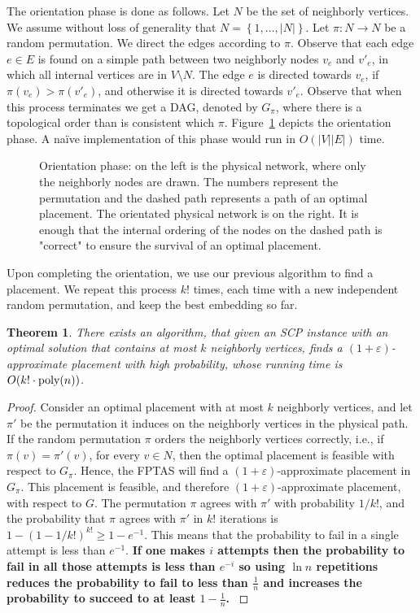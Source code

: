 \documentclass[11pt]{article}
\newcommand{\fix}[1]{{\color{purple}\textbf{#1}}}
\newtheorem{theorem}{Theorem}
\newcommand{\set}[1]{\left\{ #1 \right\}}
\newcommand{\inv}[1]{\frac{1}{#1}}
\newcommand{\abs}[1]{\left| #1 \right|}
\newcommand{\eps}{\varepsilon}
\newcommand{\scp}{\textsc{SCP}\xspace}
\begin{document}
The orientation phase is done as follows.  Let $N$ be the set of
neighborly vertices.  We assume without loss of generality that $N =
\set{1,\ldots,\abs{N}}$.
%
Let $\pi:N \to N$ be a random permutation.  We direct the edges
according to $\pi$.  
Observe that each edge $e \in E$ is found on a
simple path between two neighborly nodes $v_e$ and $v'_e$, in which
all internal vertices are in $V \setminus N$.  The edge $e$ is
directed towards $v_e$, if $\pi(v_e) > \pi(v'_e)$, and otherwise it is
directed towards $v'_e$.
%
Observe that when this process terminates we get a DAG, denoted by
$G_\pi$, where there is a topological order than is consistent which
$\pi$.  Figure~\ref{fig:orientation} depicts the orientation phase.
%
A na\"ive implementation of this phase would run in $O(|V||E|)$ time.

\begin{figure}[t]
\centering
\scalebox{0.9}{
  
}
\caption{Orientation phase: on the left is the physical network, where
  only the neighborly nodes are drawn.  The numbers represent the
  permutation and the dashed path represents a path of an optimal
  placement.  The orientated physical network is on the right.  It is
  enough that the internal ordering of the nodes on the dashed path is
  "correct" to ensure the survival of an optimal placement. }
\label{fig:orientation}
\end{figure}

Upon completing the orientation, we use our previous algorithm to find
a placement.  We repeat this process $k!$ times, each time with a new
independent random permutation, and keep the best embedding so far.

\begin{theorem}
There exists an algorithm, that given an \scp instance with an optimal
solution that contains at most $k$ neighborly vertices, finds a
$(1+\eps)$-approximate placement with high probability, whose
running time is $O(k! \cdot \text{\rm poly}(n))$.
\end{theorem}
\begin{proof}
Consider an optimal placement with at most $k$ neighborly vertices,
and let $\pi'$ be the permutation it induces on the neighborly
vertices in the physical path.
%
If the random permutation $\pi$ orders the neighborly vertices
correctly, i.e., if $\pi(v) = \pi'(v)$, for every $v \in N$, then the
optimal placement is feasible with respect to $G_\pi$.  Hence, the
FPTAS will find a $(1+\eps)$-approximate placement in $G_\pi$.  This
placement is feasible, and therefore $(1+\eps)$-approximate placement,
with respect to $G$.
%
The permutation $\pi$ agrees with $\pi'$ with probability $1/k!$, and
the probability that $\pi$ agrees with $\pi'$ in $k!$ iterations is $1
- (1 - 1/k!)^{k!} \geq 1 - e^{-1}$.  
This means that the probability to fail in a single attempt is less than $e^{-1}$. \fix{If one makes $i$ attempts then the probability to fail in all those attempts is less than $e^{-i}$ so using $\ln n$ repetitions reduces the probability to fail to less than $\frac{1}{n}$ and increases the probability to succeed to at least $1 - \inv{n}$.
}
\end{proof}
\end{document}
